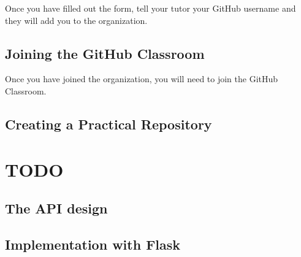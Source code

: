 \documentclass{csse4400}
\begin{document}
Once you have filled out the form,
tell your tutor your GitHub username and they will add you to the organization.

\subsection{Joining the GitHub Classroom}
Once you have joined the organization,
you will need to join the GitHub Classroom.


\subsection{Creating a Practical Repository}

\section{TODO}

\subsection{The API design}


\subsection{Implementation with Flask}




\end{document}
